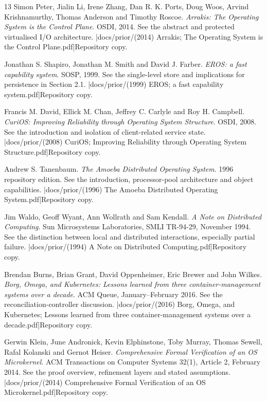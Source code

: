 \begin{thebibliography}{13}
Simon Peter, Jialin Li, Irene Zhang, Dan R. K. Ports, Doug Woos,
Arvind Krishnamurthy, Thomas Anderson and Timothy Roscoe.
\emph{Arrakis: The Operating System is the Control Plane}. OSDI, 2014.
See the abstract and protected virtualised I/O architecture.
\repofiletext|docs/prior/(2014) Arrakis; The Operating System is the Control Plane.pdf|{Repository copy.}

Jonathan S. Shapiro, Jonathan M. Smith and David J. Farber.
\emph{EROS: a fast capability system}. SOSP, 1999.
See the single-level store and implications for persistence in Section 2.1.
\repofiletext|docs/prior/(1999) EROS; a fast capability system.pdf|{Repository copy.}

Francis M. David, Ellick M. Chan, Jeffrey C. Carlyle and Roy H. Campbell.
\emph{CuriOS: Improving Reliability through Operating System Structure}.
OSDI, 2008. See the introduction and isolation of client-related service state.
\repofiletext|docs/prior/(2008) CuriOS; Improving Reliability through Operating System Structure.pdf|{Repository copy.}

Andrew S. Tanenbaum. \emph{The Amoeba Distributed Operating System}.
1996 repository edition. See the introduction, processor-pool architecture
and object capabilities.
\repofiletext|docs/prior/(1996) The Amoeba Distributed Operating System.pdf|{Repository copy.}

Jim Waldo, Geoff Wyant, Ann Wollrath and Sam Kendall.
\emph{A Note on Distributed Computing}. Sun Microsystems Laboratories,
SMLI TR-94-29, November 1994. See the distinction between local and
distributed interactions, especially partial failure.
\repofiletext|docs/prior/(1994) A Note on Distributed Computing.pdf|{Repository copy.}

Brendan Burns, Brian Grant, David Oppenheimer, Eric Brewer and John Wilkes.
\emph{Borg, Omega, and Kubernetes: Lessons learned from three
container-management systems over a decade}. ACM Queue, January--February
2016. See the reconciliation-controller discussion.
\repofiletext|docs/prior/(2016) Borg, Omega, and Kubernetes; Lessons learned from three container-management systems over a decade.pdf|{Repository copy.}

Gerwin Klein, June Andronick, Kevin Elphinstone, Toby Murray, Thomas Sewell,
Rafal Kolanski and Gernot Heiser.
\emph{Comprehensive Formal Verification of an OS Microkernel}.
ACM Transactions on Computer Systems 32(1), Article 2, February 2014.
See the proof overview, refinement layers and stated assumptions.
\repofiletext|docs/prior/(2014) Comprehensive Formal Verification of an OS Microkernel.pdf|{Repository copy.}

\end{thebibliography}
